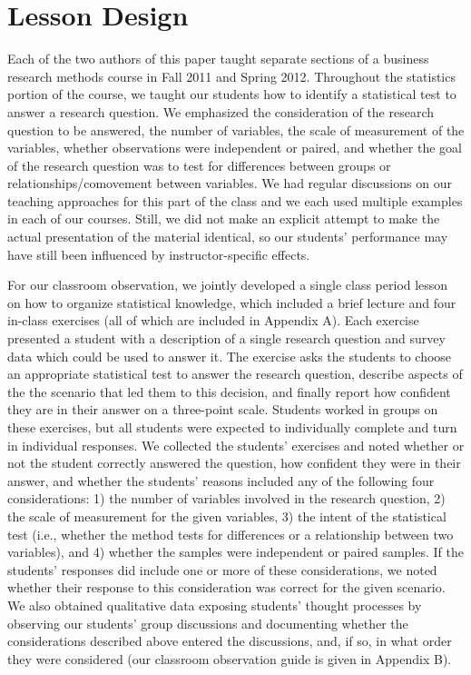 \documentclass[12pt]{article}
\begin{document}
\section{Lesson Design}

Each of the two authors of this paper taught separate sections of a business research methods course in Fall 2011 and Spring 2012.  Throughout the statistics portion of the course, we taught our students how to identify a statistical test to answer a research question.  We emphasized the consideration of the research question to be answered, the number of variables, the scale of measurement of the variables, whether observations were independent or paired, and whether the goal of the research question was to test for differences between groups or relationships/comovement between variables.  We had regular discussions on our teaching approaches for this part of the class and we each used multiple examples in each of our courses.  Still, we did not make an explicit attempt to make the actual presentation of the material identical, so our students' performance may have still been influenced by instructor-specific effects.

For our classroom observation, we jointly developed a single class period lesson on how to organize statistical knowledge, which included a brief lecture and four in-class exercises (all of which are included in Appendix A).  Each exercise presented a student with a description of a single research question and survey data which could be used to answer it.  The exercise asks the students to choose an appropriate statistical test to answer the research question, describe aspects of the the scenario that led them to this decision, and finally report how confident they are in their answer on a three-point scale.  Students worked in groups on these exercises, but all students were expected to individually complete and turn in individual responses.  We collected the students' exercises and noted whether or not the student correctly answered the question, how confident they were in their answer, and whether the students' reasons included any of the following four considerations: 1) the number of variables involved in the research question, 2) the scale of measurement for the given variables, 3) the intent of the statistical test (i.e., whether the method tests for differences or a relationship between two variables), and 4) whether the samples were independent or paired samples.  If the students' responses did include one or more of these considerations, we noted whether their response to this consideration was correct for the given scenario.  We also obtained qualitative data exposing students' thought processes by observing our students' group discussions and documenting whether the considerations described above entered the discussions, and, if so, in what order they were considered (our classroom observation guide is given in Appendix B).
\end{document}
